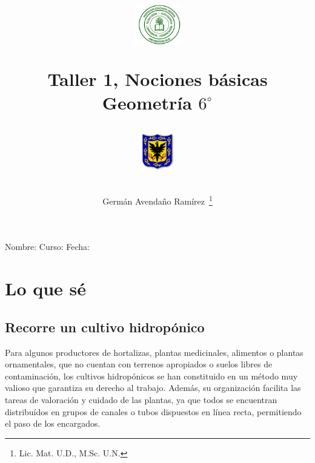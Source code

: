 \documentclass[10pt,twoside]{article}
\author{Germ\'{a}n Avenda\~no Ram\'{i}rez~\thanks{Lic. Mat. U.D., M.Sc. U.N.}}
\title{\begin{minipage}{.2\textwidth}
\includegraphics[height=1.75cm]{Images/logo-colegio.png}\end{minipage}
\begin{minipage}{.55\textwidth}
\begin{center}
Taller 1, Nociones básicas\\
Geometría $6^{\circ}$
\end{center}
\end{minipage}\hfill
\begin{minipage}{.2\textwidth}
\includegraphics[height=1.75cm]{Images/logo-sed.png} 
\end{minipage}}
\date{}
\begin{document}
\maketitle
Nombre: \hrulefill Curso: \underline{\hspace*{44pt}} Fecha: \underline{\hspace*{2.5cm}}\\

\section*{Lo que s\'{e}}
\subsection*{Recorre un cultivo hidrop\'{o}nico}
Para algunos productores de hortalizas, plantas medicinales, alimentos o plantas ornamentales, que no cuentan con terrenos apropiados o suelos libres de contaminación, los cultivos hidropónicos se han constituido en un método muy valioso que garantiza su derecho al trabajo. Además, su organización facilita las tareas de valoración y cuidado de las plantas, ya que todos se encuentran distribuídos en grupos de canales o tubos dispuestos en línea recta, permitiendo el paso de los encargados.
\end{document}
